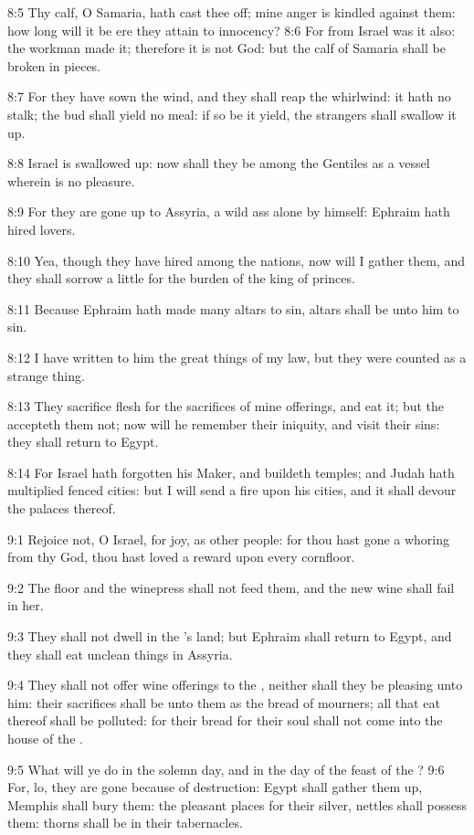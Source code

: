 8:5 Thy calf, O Samaria, hath cast thee off; mine anger is kindled against them: how long will it be ere they attain to innocency?  8:6 For from Israel was it also: the workman made it; therefore it is not God: but the calf of Samaria shall be broken in pieces.

8:7 For they have sown the wind, and they shall reap the whirlwind: it hath no stalk; the bud shall yield no meal: if so be it yield, the strangers shall swallow it up.

8:8 Israel is swallowed up: now shall they be among the Gentiles as a vessel wherein is no pleasure.

8:9 For they are gone up to Assyria, a wild ass alone by himself: Ephraim hath hired lovers.

8:10 Yea, though they have hired among the nations, now will I gather them, and they shall sorrow a little for the burden of the king of princes.

8:11 Because Ephraim hath made many altars to sin, altars shall be unto him to sin.

8:12 I have written to him the great things of my law, but they were counted as a strange thing.

8:13 They sacrifice flesh for the sacrifices of mine offerings, and eat it; but the \LORD accepteth them not; now will he remember their iniquity, and visit their sins: they shall return to Egypt.

8:14 For Israel hath forgotten his Maker, and buildeth temples; and Judah hath multiplied fenced cities: but I will send a fire upon his cities, and it shall devour the palaces thereof.

9:1 Rejoice not, O Israel, for joy, as other people: for thou hast gone a whoring from thy God, thou hast loved a reward upon every cornfloor.

9:2 The floor and the winepress shall not feed them, and the new wine shall fail in her.

9:3 They shall not dwell in the \LORD's land; but Ephraim shall return to Egypt, and they shall eat unclean things in Assyria.

9:4 They shall not offer wine offerings to the \LORD, neither shall they be pleasing unto him: their sacrifices shall be unto them as the bread of mourners; all that eat thereof shall be polluted: for their bread for their soul shall not come into the house of the \LORD.

9:5 What will ye do in the solemn day, and in the day of the feast of the \LORD?  9:6 For, lo, they are gone because of destruction: Egypt shall gather them up, Memphis shall bury them: the pleasant places for their silver, nettles shall possess them: thorns shall be in their tabernacles.

